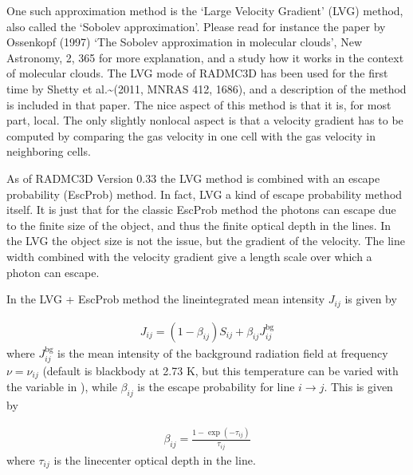 \documentclass[letterpaper,10pt,english]{sphinxmanual}
\begin{document}
One such approximation method is the ‘Large Velocity Gradient’ (LVG)
method, also called the ‘Sobolev approximation’.  Please read for instance
the paper by Ossenkopf (1997) ‘The Sobolev approximation in molecular
clouds’, New Astronomy, 2, 365 for more explanation, and a study how it
works in the context of molecular clouds. The LVG mode of RADMC\sphinxhyphen{}3D has been
used for the first time by Shetty et al.\textasciitilde{}(2011, MNRAS 412, 1686), and a
description of the method is included in that paper.  The nice aspect of
this method is that it is, for most part, local. The only slightly non\sphinxhyphen{}local
aspect is that a velocity gradient has to be computed by comparing the gas
velocity in one cell with the gas velocity in neighboring cells.

As of RADMC\sphinxhyphen{}3D Version 0.33 the LVG method is combined with an escape
probability (EscProb) method. In fact, LVG  a kind of escape probability
method itself. It is just that for the classic EscProb method the photons can
escape due to the finite size of the object, and thus the finite optical
depth in the lines. In the LVG the object size is not the issue, but the
gradient of the velocity. The line width combined with the velocity gradient
give a length scale over which a photon can escape.

In the LVG + EscProb method the line\sphinxhyphen{}integrated mean intensity \(J_{ij}\) is
given by

\label{\detokenize{lineradtrans:eq-linemeanint-escp}}\begin{equation*}
\begin{split}J_{ij} = (1-\beta_{ij})S_{ij} + \beta_{ij}J_{ij}^{\mathrm{bg}}\end{split}
\end{equation*}
where \(J_{ij}^{\mathrm{bg}}\) is the mean intensity of the background
radiation field at frequency \(\nu=\nu_{ij}\) (default is blackbody at 2.73 K,
but this temperature can be varied with the  variable
in ), while \(\beta_{ij}\) is the escape probability
for line \(i\rightarrow j\). This is given by

\label{\detokenize{lineradtrans:eq-escprob-beta-formula}}\begin{equation*}
\begin{split}\beta_{ij} = \frac{1-\exp(-\tau_{ij})}{\tau_{ij}}\end{split}
\end{equation*}
where \(\tau_{ij}\) is the line\sphinxhyphen{}center optical depth in the line.
\end{document}
